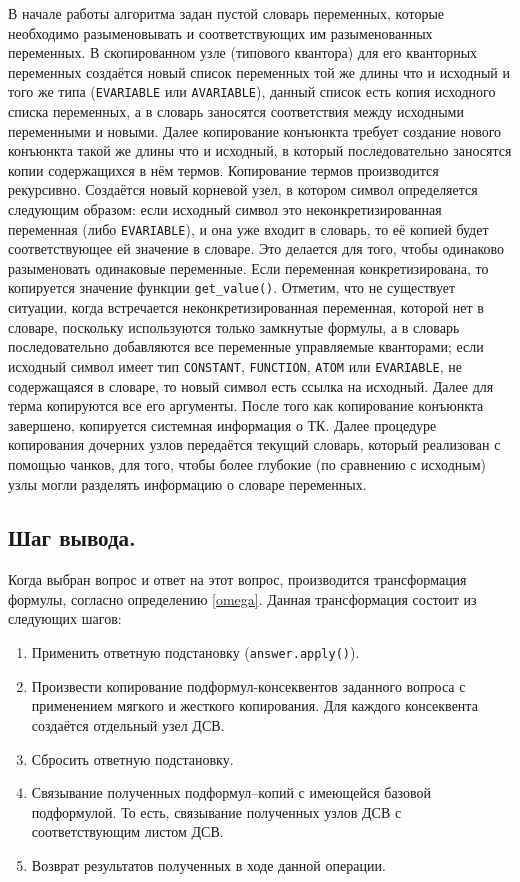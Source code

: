 В начале работы алгоритма задан пустой словарь переменных, которые необходимо разыменовывать и соответствующих им разыменованных переменных. В скопированном узле (типового квантора) для его кванторных переменных создаётся новый список переменных той же длины что и исходный и того же типа (\texttt{EVARIABLE} или \texttt{AVARIABLE}), данный список есть копия исходного списка переменных, а в словарь заносятся соответствия между исходными переменными и новыми. Далее копирование конъюнкта требует создание нового конъюнкта такой же длины что и исходный, в который последовательно заносятся копии содержащихся в нём термов. Копирование термов производится рекурсивно. Создаётся новый корневой узел, в котором символ определяется следующим образом:  если исходный символ это неконкретизированная переменная (либо \texttt{EVARIABLE}), и она уже входит в словарь, то её копией будет соответствующее ей значение в словаре. Это делается для того, чтобы одинаково разыменовать одинаковые переменные. Если переменная конкретизирована, то копируется значение функции {\tt get\_value()}. Отметим, что не существует ситуации, когда встречается неконкретизированная переменная, которой нет в словаре, поскольку используются только замкнутые формулы, а в словарь последовательно добавляются все переменные управляемые кванторами; если исходный символ имеет тип \texttt{CONSTANT}, \texttt{FUNCTION}, \texttt{ATOM} или \texttt{EVARIABLE}, не содержащаяся в словаре, то новый символ есть ссылка на исходный. Далее для терма копируются все его аргументы. После того как копирование конъюнкта завершено, копируется системная информация о ТК. Далее процедуре копирования дочерних узлов передаётся текущий словарь, который реализован с помощью чанков, для того, чтобы более глубокие (по сравнению с исходным) узлы могли разделять информацию о словаре переменных.


\subsection{Шаг вывода.} Когда выбран вопрос и ответ на этот вопрос, производится трансформация формулы, согласно определению \ref{omega}.
Данная трансформация состоит из следующих шагов:
\begin{enumerate}
\item Применить ответную подстановку (\texttt{answer.apply()}).
\item Произвести копирование подформул-консеквентов заданного вопроса с применением мягкого и жесткого копирования. Для каждого консеквента создаётся отдельный узел ДСВ.
\item Сбросить ответную подстановку.
\item Связывание полученных подформул--копий с имеющейся базовой подформулой. То есть, связывание полученных узлов ДСВ с соответствующим листом ДСВ.
\item Возврат результатов полученных в ходе данной операции.
\end{enumerate}


